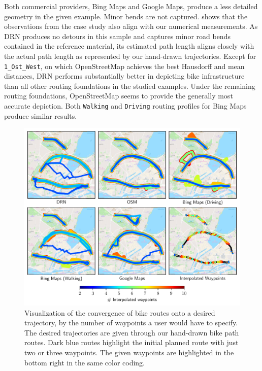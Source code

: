 Both commercial providers, Bing Maps and Google Maps, produce a less detailed geometry in the given example. Minor bends are not captured.  shows that the observations from the case study also align with our numerical measurements. As DRN produces no detours in this sample and captures minor road bends contained in the reference material, its estimated path length aligns closely with the actual path length as represented by our hand-drawn trajectories. Except for \texttt{1\_Ost\_West}, on which OpenStreetMap achieves the best Hausdorff and mean distances, DRN performs substantially better in depicting bike infrastructure than all other routing foundations in the studied examples. Under the remaining routing foundations, OpenStreetMap seems to provide the generally most accurate depiction. Both \texttt{Walking} and \texttt{Driving} routing profiles for Bing Maps produce similar results.

\begin{figure}[t]
\centering 
\includegraphics[width=\linewidth]{images/routing-convergence-process.pdf}
\caption{Visualization of the convergence of bike routes onto a desired trajectory, by the number of waypoints a user would have to specify. The desired trajectories are given through our hand-drawn bike path routes. Dark blue routes highlight the initial planned route with just two or three waypoints. The given waypoints are highlighted in the bottom right in the same color coding.}
\label{fig:routing-convergence-process}
\end{figure}

